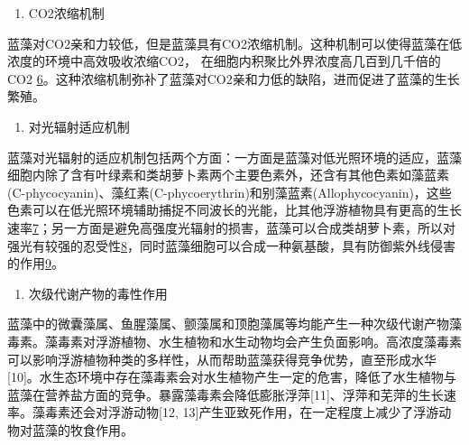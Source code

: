 \documentclass[
]{book}
\providecommand{\tightlist}{%
  \setlength{\itemsep}{0pt}\setlength{\parskip}{0pt}}
\begin{document}
\begin{enumerate}
\def\labelenumi{\arabic{enumi}.}
\setcounter{enumi}{2}
\tightlist
\item
  CO2浓缩机制
\end{enumerate}

蓝藻对CO2亲和力较低，但是蓝藻具有CO2浓缩机制。这种机制可以使得蓝藻在低浓度的环境中高效吸收浓缩CO2， 在细胞内积聚比外界浓度高几百到几千倍的 CO2 \href{Gupta\%20V\%20K,\%20Ganjali\%20M\%20R,\%20et\%20al.\%20Chemical\%20Engineering\%20Journal,\%202012,\%20197:\%20330.}{6}。这种浓缩机制弥补了蓝藻对CO2亲和力低的缺陷，进而促进了蓝藻的生长繁殖。

\begin{enumerate}
\def\labelenumi{\arabic{enumi}.}
\setcounter{enumi}{3}
\tightlist
\item
  对光辐射适应机制
\end{enumerate}

蓝藻对光辐射的适应机制包括两个方面：一方面是蓝藻对低光照环境的适应，蓝藻细胞内除了含有叶绿素和类胡萝卜素两个主要色素外，还含有其他色素如藻蓝素(C-phycocyanin)、藻红素(C-phycoerythrin)和别藻蓝素(Allophycocyanin)，这些色素可以在低光照环境辅助捕捉不同波长的光能，比其他浮游植物具有更高的生长速率\href{Liu\%20R\%20L,\%20Liu\%20Y,\%20et\%20al.\%20Bioresourse\%20Technology\%202014,\%20154:\%20138.}{7}；另一方面是避免高强度光辐射的损害，蓝藻可以合成类胡萝卜素，所以对强光有较强的忍受性\href{Gao\%20F,Qu\%20J\%20Y,\%20et\%20al.\%20Electrochim.\%20Acta\%202016,\%20190:\%201134.}{8}，同时蓝藻细胞可以合成一种氨基酸，具有防御紫外线侵害的作用\href{Jiang\%20J,\%20Zhu\%20J\%20H,\%20et\%20al.\%20Energy\%20Environ.\%20Sci.\%202014,\%207:\%202670.}{9}。

\begin{enumerate}
\def\labelenumi{\arabic{enumi}.}
\setcounter{enumi}{4}
\tightlist
\item
  次级代谢产物的毒性作用
\end{enumerate}

蓝藻中的微囊藻属、鱼腥藻属、颤藻属和顶胞藻属等均能产生一种次级代谢产物藻毒素。藻毒素对浮游植物、水生植物和水生动物均会产生负面影响。高浓度藻毒素可以影响浮游植物种类的多样性，从而帮助蓝藻获得竞争优势，直至形成水华{[}10{]}。水生态环境中存在藻毒素会对水生植物产生一定的危害，降低了水生植物与蓝藻在营养盐方面的竞争。暴露藻毒素会降低膨胀浮萍{[}11{]}、浮萍和芜萍的生长速率。藻毒素还会对浮游动物{[}12, 13{]}产生亚致死作用，在一定程度上减少了浮游动物对蓝藻的牧食作用。
\end{document}
